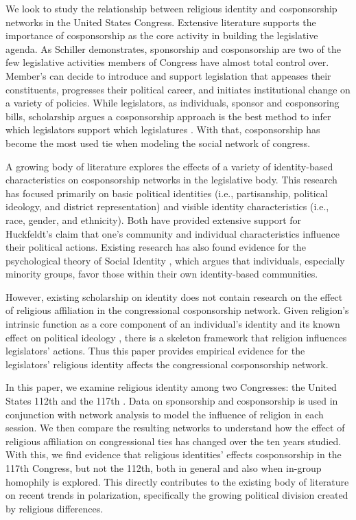\documentclass[Royal,times,sageh]{sagej}
\begin{document}
We look to study the relationship between religious identity and
cosponsorship networks in the United States Congress. Extensive
literature supports the importance of cosponsorship as the core activity
in building the legislative agenda. As Schiller
\citeyearpar{schiller1995} demonstrates, sponsorship and cosponsorship
are two of the few legislative activities members of Congress have
almost total control over. Member's can decide to introduce and support
legislation that appeases their constituents, progresses their political
career, and initiates institutional change on a variety of policies.
While legislators, as individuals, sponsor and cosponsoring bills,
scholarship argues a cosponsorship approach is the best method to infer
which legislators support which legislatures \citep{fowler2006}. With
that, cosponsorship has become the most used tie when modeling the
social network of congress.

A growing body of literature explores the effects of a variety of
identity-based characteristics on cosponsorship networks in the
legislative body. This research has focused primarily on basic political
identities (i.e., partisanship, political ideology, and district
representation) and visible identity characteristics (i.e., race,
gender, and ethnicity). Both have provided extensive support for
Huckfeldt's \citeyearpar{huckfeldt1983} claim that one's community and
individual characteristics influence their political actions. Existing
research has also found evidence for the psychological theory of Social
Identity \citep{tajfel}, which argues that individuals, especially
minority groups, favor those within their own identity-based
communities.

However, existing scholarship on identity does not contain research on
the effect of religious affiliation in the congressional cosponsorship
network. Given religion's intrinsic function as a core component of an
individual's identity and its known effect on political ideology
\citep{mctague}, there is a skeleton framework that religion influences
legislators' actions. Thus this paper provides empirical evidence for
the legislators' religious identity affects the congressional
cosponsorship network.

In this paper, we examine religious identity among two Congresses: the
United States 112th and the 117th . Data on sponsorship and
cosponsorship is used in conjunction with network analysis to model the
influence of religion in each session. We then compare the resulting
networks to understand how the effect of religious affiliation on
congressional ties has changed over the ten years studied. With this, we
find evidence that religious identities' effects cosponsorship in the
117th Congress, but not the 112th, both in general and also when
in-group homophily is explored. This directly contributes to the
existing body of literature on recent trends in polarization,
specifically the growing political division created by religious
differences.
\end{document}
